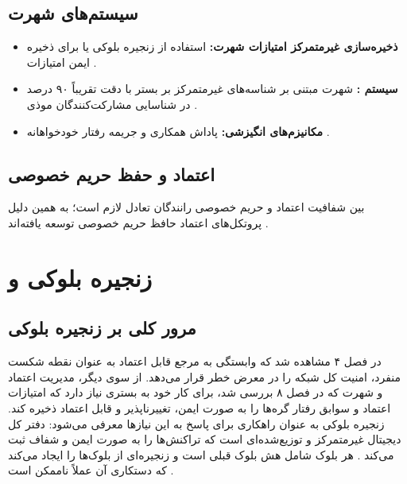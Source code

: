 \documentclass[12pt,a4paper]{article}
\begin{document}
\subsection{سیستم‌های شهرت}

\begin{itemize}
  \item \textbf{ذخیره‌سازی غیرمتمرکز امتیازات شهرت:} استفاده از زنجیره بلوکی یا  برای ذخیره ایمن امتیازات \cite{feraudoDIVADIDbasedReputation2024}.
  \item \textbf{سیستم :} شهرت مبتنی بر شناسه‌های غیرمتمرکز بر بستر  با دقت تقریباً ۹۰ درصد در شناسایی مشارکت‌کنندگان موذی \cite{feraudoDIVADIDbasedReputation2024}.
  \item \textbf{مکانیزم‌های انگیزشی:} پاداش همکاری و جریمه رفتار خودخواهانه \cite{farsimadanReviewSecurityChallenges2025}.
\end{itemize}

\subsection{اعتماد و حفظ حریم خصوصی}

بین شفافیت اعتماد و حریم خصوصی رانندگان تعادل لازم است؛ به همین دلیل پروتکل‌های اعتماد حافظ حریم خصوصی توسعه یافته‌اند \cite{farsimadanReviewSecurityChallenges2025, rahmawatiagustinaSystematicLiteratureReview2025}.

\section{زنجیره بلوکی و }

\subsection{مرور کلی بر زنجیره بلوکی}

در فصل ۴ مشاهده شد که وابستگی به مرجع قابل اعتماد به عنوان نقطه شکست منفرد، امنیت کل شبکه را در معرض خطر قرار می‌دهد. از سوی دیگر، مدیریت اعتماد و شهرت که در فصل ۸ بررسی شد، برای کار خود به بستری نیاز دارد که امتیازات اعتماد و سوابق رفتار گره‌ها را به صورت ایمن، تغییرناپذیر و قابل اعتماد ذخیره کند. زنجیره بلوکی به عنوان راهکاری برای پاسخ به این نیازها معرفی می‌شود: دفتر کل دیجیتال غیرمتمرکز و توزیع‌شده‌ای است که تراکنش‌ها را به صورت ایمن و شفاف ثبت می‌کند \cite{razaBlockchainBasedReputationTrust2024, hozouriOverviewVANETVehicular2023}. هر بلوک شامل هش بلوک قبلی است و زنجیره‌ای از بلوک‌ها را ایجاد می‌کند که دستکاری آن عملاً ناممکن است \cite{razaBlockchainBasedReputationTrust2024}.
\end{document}
